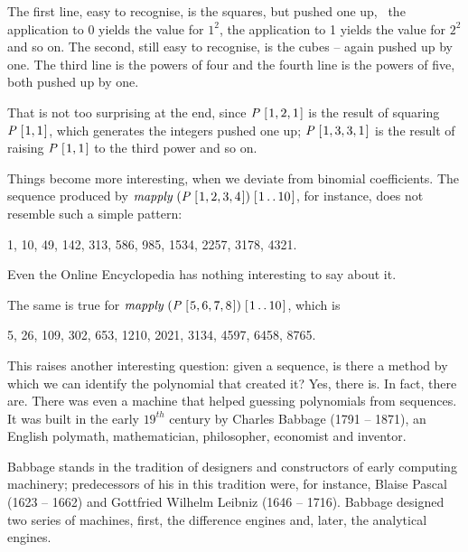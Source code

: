 \documentclass[tikz]{scrreprt}
\newcommand{\Conid}[1]{\mathit{#1}}
\newcommand{\Varid}[1]{\mathit{#1}}
\begin{document}
The first line, easy to recognise, is the squares, but pushed one up,
\ie\ the application to 0 yields the value for $1^2$, 
the application to 1 yields the value for $2^2$ and so on.
The second, still easy to recognise,
is the cubes -- again pushed up by one.
The third line is the powers of four 
and the fourth line is the powers of five,
both pushed up by one.

That is not too surprising at the end, since
\ensuremath{\Conid{P}\;[\mskip1.5mu \mathrm{1},\mathrm{2},\mathrm{1}\mskip1.5mu]} is the result of squaring \ensuremath{\Conid{P}\;[\mskip1.5mu \mathrm{1},\mathrm{1}\mskip1.5mu]}, 
which generates the integers pushed one up;
\ensuremath{\Conid{P}\;[\mskip1.5mu \mathrm{1},\mathrm{3},\mathrm{3},\mathrm{1}\mskip1.5mu]} is the result of raising \ensuremath{\Conid{P}\;[\mskip1.5mu \mathrm{1},\mathrm{1}\mskip1.5mu]} to the third power
and so on.

Things become more interesting, when we deviate
from binomial coefficients. The sequence
produced by \ensuremath{\Varid{mapply}\;(\Conid{P}\;[\mskip1.5mu \mathrm{1},\mathrm{2},\mathrm{3},\mathrm{4}\mskip1.5mu])\;[\mskip1.5mu \mathrm{1}\mathinner{\ldotp\ldotp}\mathrm{10}\mskip1.5mu]}, for instance,
does not resemble such a simple pattern:

1, 10, 49, 142, 313, 586, 985, 1534, 2257, 3178, 4321.

Even the Online Encyclopedia has nothing interesting
to say about it.

The same is true for \ensuremath{\Varid{mapply}\;(\Conid{P}\;[\mskip1.5mu \mathrm{5},\mathrm{6},\mathrm{7},\mathrm{8}\mskip1.5mu])\;[\mskip1.5mu \mathrm{1}\mathinner{\ldotp\ldotp}\mathrm{10}\mskip1.5mu]},
which is 

5, 26, 109, 302, 653, 1210, 2021, 3134, 4597, 6458, 8765.

This raises another interesting question:
given a sequence, is there a method by which 
we can identify the polynomial that created it?
Yes, there is. In fact, there are.
There was even a machine that helped guessing
polynomials from sequences. It was built in the early
$19^{th}$ century by Charles Babbage (1791 -- 1871),
an English polymath, mathematician, philosopher,
economist and inventor.

Babbage stands in the tradition of designers and constructors
of early computing machinery; predecessors of his
in this tradition were, for instance, 
Blaise Pascal (1623 -- 1662) and
Gottfried Wilhelm Leibniz (1646 -- 1716).
Babbage designed two series of machines,
first, the difference engines and, later, 
the analytical engines.
\end{document}
